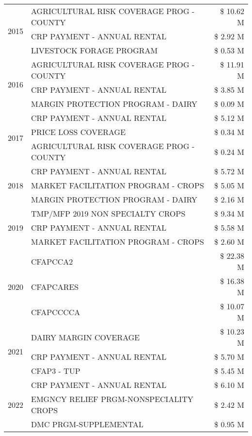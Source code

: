 \begin{tabular}{llr}
\cline{1-3}
\multirow[t]{3}{*}{2015} & AGRICULTURAL RISK COVERAGE PROG - COUNTY & \$ 10.62 M \\
 & CRP PAYMENT - ANNUAL RENTAL & \$ 2.92 M \\
 & LIVESTOCK FORAGE PROGRAM & \$ 0.53 M \\
\cline{1-3}
\multirow[t]{3}{*}{2016} & AGRICULTURAL RISK COVERAGE PROG - COUNTY & \$ 11.91 M \\
 & CRP PAYMENT - ANNUAL RENTAL & \$ 3.85 M \\
 & MARGIN PROTECTION PROGRAM - DAIRY & \$ 0.09 M \\
\cline{1-3}
\multirow[t]{3}{*}{2017} & CRP PAYMENT - ANNUAL RENTAL & \$ 5.12 M \\
 & PRICE LOSS COVERAGE & \$ 0.34 M \\
 & AGRICULTURAL RISK COVERAGE PROG - COUNTY & \$ 0.24 M \\
\cline{1-3}
\multirow[t]{3}{*}{2018} & CRP PAYMENT - ANNUAL RENTAL & \$ 5.72 M \\
 & MARKET FACILITATION PROGRAM - CROPS & \$ 5.05 M \\
 & MARGIN PROTECTION PROGRAM - DAIRY & \$ 2.16 M \\
\cline{1-3}
\multirow[t]{3}{*}{2019} & TMP/MFP 2019 NON SPECIALTY CROPS & \$ 9.34 M \\
 & CRP PAYMENT - ANNUAL RENTAL & \$ 5.58 M \\
 & MARKET FACILITATION PROGRAM - CROPS & \$ 2.60 M \\
\cline{1-3}
\multirow[t]{3}{*}{2020} & CFAPCCA2 & \$ 22.38 M \\
 & CFAPCARES & \$ 16.38 M \\
 & CFAPCCCCA & \$ 10.07 M \\
\cline{1-3}
\multirow[t]{3}{*}{2021} & DAIRY MARGIN COVERAGE & \$ 10.23 M \\
 & CRP PAYMENT - ANNUAL RENTAL & \$ 5.70 M \\
 & CFAP3 - TUP & \$ 5.45 M \\
\cline{1-3}
\multirow[t]{3}{*}{2022} & CRP PAYMENT - ANNUAL RENTAL & \$ 6.10 M \\
 & EMGNCY RELIEF PRGM-NONSPECIALITY CROPS & \$ 2.42 M \\
 & DMC PRGM-SUPPLEMENTAL & \$ 0.95 M \\
\cline{1-3}
\bottomrule
\end{tabular}

